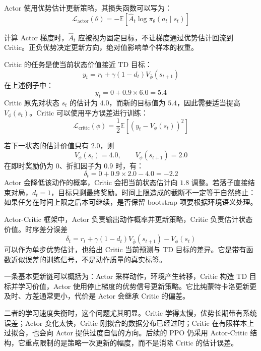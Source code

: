 Actor 使用优势估计更新策略，其损失函数可以写为：
\begin{equation}
\mathcal{L}_{\mathrm{actor}}(\theta)
=
-
\mathbb{E}
\left[
\widehat{A}_t
\log
\pi_{\theta}(a_t\mid s_t)
\right]
\end{equation}

计算 Actor 梯度时，$\widehat A_t$ 应被视为固定目标，不让梯度通过优势估计回流到 Critic。正负优势决定更新方向，绝对值影响单个样本的权重。

Critic 的任务是使当前状态价值接近 TD 目标：
\begin{equation}
y_t=r_t+\gamma(1-d_t)V_{\bar\phi}(s_{t+1})
\end{equation}
在上述例子中：
\begin{equation}
y_t
=
0+0.9\times6.0
=
5.4
\end{equation}
Critic 原先对状态 $s_t$ 的估计为 $4.0$，而新的目标值为 $5.4$，因此需要适当提高 $V_{\phi}(s_t)$。Critic 可以使用平方误差进行训练：
\begin{equation}
\mathcal{L}_{\mathrm{critic}}(\phi)
=
\frac{1}{2}
\mathbb{E}
\left[
\left(
y_t-V_{\phi}(s_t)
\right)^2
\right]
\end{equation}

若下一状态的估计价值只有 $2.0$，则
\begin{equation}
V_{\phi}(s_t)=4.0,\qquad
V_{\phi}(s_{t+1})=2.0
\end{equation}
在即时奖励仍为 $0$、折扣因子为 $0.9$ 时，有：
\begin{equation}
\delta_t
=
0+0.9\times2.0-4.0
=
-2.2
\end{equation}
Actor 会降低该动作的概率，Critic 会把当前状态估计向 $1.8$ 调整。若落子直接结束对局，$d_t=1$，目标只剩最终奖励。时间上限造成的截断不一定等于自然终止：如果任务在时间上限之后本可继续，是否保留 bootstrap 项要根据环境语义处理。

Actor-Critic 框架中，Actor 负责输出动作概率并更新策略，Critic 负责估计状态价值。时序差分误差
  \[
  \delta_t=r_t+\gamma(1-d_t)V_{\bar\phi}(s_{t+1})-V_{\phi}(s_t)
  \]
可以作为单步优势估计，也给出 Critic 当前预测与 TD 目标的差异。它是带有函数近似误差的训练信号，不是动作质量的真实标签。

一条基本更新链可以概括为：Actor 采样动作，环境产生转移，Critic 构造 TD 目标并学习价值，Actor 使用停止梯度的优势信号更新策略。它比纯蒙特卡洛更新更及时、方差通常更小，代价是 Actor 会继承 Critic 的偏差。

二者的学习速度失衡时，这个问题尤其明显。Critic 学得太慢，优势长期带有系统误差；Actor 变化太快，Critic 刚拟合的数据分布已经过时；Critic 在有限样本上过拟合，也会向 Actor 提供过度自信的方向。后续的 PPO 仍采用 Actor-Critic 结构，它重点限制的是策略一次更新的幅度，而不是消除 Critic 的估计误差。

